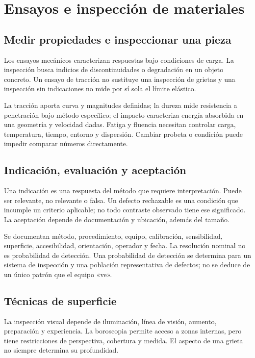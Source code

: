 \chapter{Ensayos e inspección de materiales}\label{ch:11}
\section{Medir propiedades e inspeccionar una pieza}
Los ensayos mecánicos caracterizan respuestas bajo condiciones de carga. La inspección busca indicios de discontinuidades o degradación en un objeto concreto. Un ensayo de tracción no sustituye una inspección de grietas y una inspección sin indicaciones no mide por sí sola el límite elástico.

La tracción aporta curva y magnitudes definidas; la dureza mide resistencia a penetración bajo método específico; el impacto caracteriza energía absorbida en una geometría y velocidad dadas. Fatiga y fluencia necesitan controlar carga, temperatura, tiempo, entorno y dispersión. Cambiar probeta o condición puede impedir comparar números directamente.
\section{Indicación, evaluación y aceptación}
Una indicación es una respuesta del método que requiere interpretación. Puede ser relevante, no relevante o falsa. Un defecto rechazable es una condición que incumple un criterio aplicable; no todo contraste observado tiene ese significado. La aceptación depende de documentación y ubicación, además del tamaño.

Se documentan método, procedimiento, equipo, calibración, sensibilidad, superficie, accesibilidad, orientación, operador y fecha. La resolución nominal no es probabilidad de detección. Una probabilidad de detección se determina para un sistema de inspección y una población representativa de defectos; no se deduce de un único patrón que el equipo «ve».
\section{Técnicas de superficie}
La inspección visual depende de iluminación, línea de visión, aumento, preparación y experiencia. La boroscopia permite acceso a zonas internas, pero tiene restricciones de perspectiva, cobertura y medida. El aspecto de una grieta no siempre determina su profundidad.

